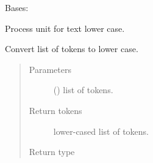 \documentclass[letterpaper,10pt,english]{sphinxmanual}
\begin{document}
\begin{fulllineitems}
\label{\detokenize{matchzoo:matchzoo.preprocessors.LowercaseUnit}}
Bases: {\hyperref[\detokenize{matchzoo:matchzoo.preprocessors.ProcessorUnit}]{}}

Process unit for text lower case.

\begin{fulllineitems}
\label{\detokenize{matchzoo:matchzoo.preprocessors.LowercaseUnit.transform}}
Convert list of tokens to lower case.
\begin{quote}\begin{description}
\item[{Parameters}] \leavevmode
{} () \textendash{} list of tokens.

\item[{Return tokens}] \leavevmode
lower-cased list of tokens.

\item[{Return type}] \leavevmode
{}

\end{description}\end{quote}

\end{fulllineitems}


\end{fulllineitems}

\end{document}
